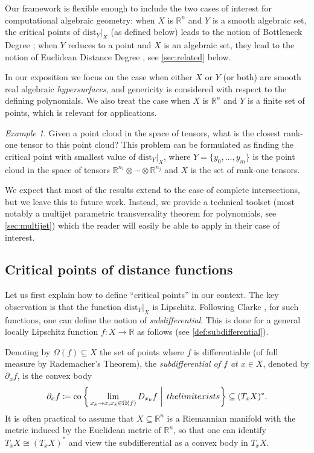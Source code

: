 \documentclass{amsart}
\newcommand{\R}{\mathbb{R}}
\newcommand{\dist}{{\mathrm{dist}_Y|_X}}
\theoremstyle{definition}
\theoremstyle{remark}
\newtheorem{example}[subsubsection]{Example}
\begin{document}
Our framework is flexible enough to include the two cases of interest for computational algebraic geometry: when $X$ is $\R^n$ and $Y$ is a smooth algebraic set, the critical points of $\dist$ (as defined below) leads to the notion of Bottleneck Degree \cite{DiRocco_Eklund_Weinstein}; when $Y$ reduces to a point and $X$ is an algebraic set, they  lead to the notion of Euclidean Distance Degree \cite{EDD_Draisma}, see \cref{sec:related} below.


In our exposition we focus on the case when either $X$ or $Y$ (or both) are smooth real algebraic \emph{hypersurfaces}, and genericity is considered with respect to the defining polynomials. We also treat the case when $X$ is $\R^n$ and $Y$ is a finite set of points, which is relevant for applications.

\begin{example}\label{lowrank_approx:example} Given a point cloud in the space of tensors, what is the closest rank-one tensor to this point cloud? This problem can be formulated as finding the critical point with smallest value of $\dist$, where $Y=\{y_0, \ldots, y_m\}$ is the point cloud in the space of tensors $\R^{n_1}\otimes\cdots \otimes\R^{n_j}$ and $X$ is the set of rank-one tensors.
\end{example}
We expect that most of the results extend to the case of complete intersections, but we leave this to future work. Instead, we provide a technical toolset (most notably a multijet parametric transversality theorem for polynomials, see \cref{sec:multijet}) which the reader will easily be able to apply in their case of interest.

\subsection{Critical points of distance functions}
Let us first explain how to define ``critical points'' in our context. The key observation is that the function $\dist$ is Lipschitz. Following Clarke \cite{Clarke}, for such functions, one can define the notion of \emph{subdifferential}. This is done for a general locally Lipschitz function $f \colon X \to \R$ as follows (see \cref{def:subdifferential}). 

Denoting by $\Omega(f) \subseteq X$ the set of points where $f$ is differentiable (of full measure by Rademacher's Theorem), the \emph{subdifferential of $f$ at $x\in X$}, denoted by $\partial_x f$, is the convex body
\[
\partial_xf \coloneqq \mathrm{co}\left\{ \left. \lim_{x_k \to x, x_k \in \Omega(f)} D_{x_k} f \; \right| \; \textnormal{the limit exists}\right\} \subseteq (T_x X)^*.
\]
It is often practical to assume that $X\subseteq \R^n$ is a Riemannian manifold with the metric induced by the Euclidean metric of $\R^n$, so that one can identify $T_x X \cong (T_x X)^*$ and view the subdifferential as a convex body in $T_x X$.
\end{document}
